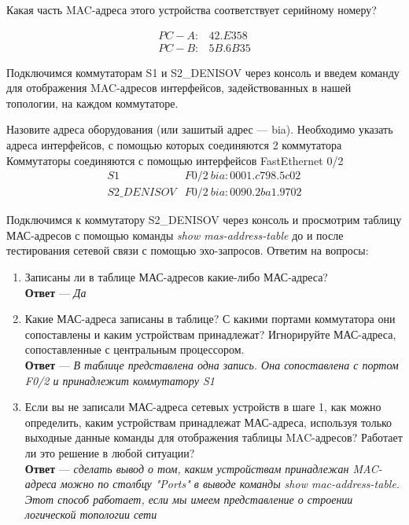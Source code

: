 \documentclass[a4paper,14pt]{extarticle}
\begin{document}
Какая часть MAC-адреса этого устройства соответствует серийному номеру?

\begin{align*}
PC-A:& 42.E358\\
PC-B:& 5B.6B35
\end{align*}

Подключимся коммутаторам S1 и S2\_DENISOV через консоль и введем команду для
отображения MAC-адресов интерфейсов, задействованных в нашей топологии, на каждом
коммутаторе. 

Назовите адреса оборудования (или зашитый адрес — bia). Необходимо указать
адреса интерфейсов, с помощью которых соединяются 2 коммутатора
Коммутаторы соединяются с помощью интерфейсов FastEthernet 0/2
\begin{align*}
S1 &F0/2~bia: 0001.c798.5c02\\
S2\_DENISOV &F0/2~bia: 0090.2ba1.9702
\end{align*}

Подключимся к коммутатору S2\_DENISOV через консоль и просмотрим таблицу МАС-адресов с помощью команды \textit{show mas-address-table} до и
после тестирования сетевой связи с помощью эхо-запросов. Ответим на вопросы:
\begin{enumerate}
	\item Записаны ли в таблице МАС-адресов какие-либо МАС-адреса? \\\textbf{Ответ} --- \textit{Да}
	\item Какие МАС-адреса записаны в таблице? С какими портами коммутатора они сопоставлены и каким
	устройствам принадлежат? Игнорируйте МАС-адреса, сопоставленные с центральным
	процессором.\\\textbf{Ответ} --- \textit{В таблице представлена одна запись. Она сопоставлена с портом F0/2 и принадлежит коммутатору S1}
	\item Если вы не записали МАС-адреса сетевых устройств в шаге 1, как можно определить, каким
	устройствам принадлежат МАС-адреса, используя только выходные данные команды для
	отображения таблицы MAC-адресов? Работает ли это решение в любой ситуации?\\
	\textbf{Ответ} --- \textit{сделать вывод о том, каким устройствам принадлежан MAC-адреса можно по столбцу "Ports" в выводе команды show mac-address-table. Этот способ работает, если мы имеем представление о строении логической топологии сети}
\end{enumerate}


\end{document}
